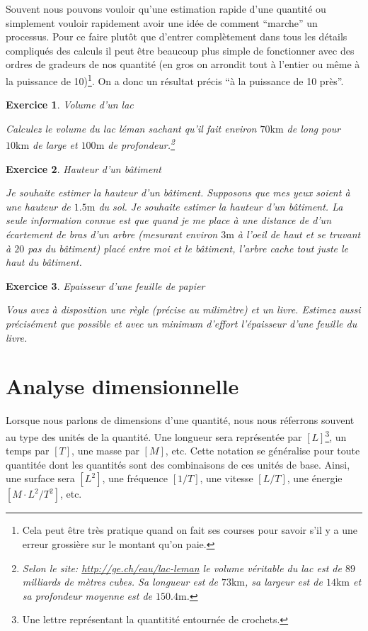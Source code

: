 \documentclass[a4paper,12pt]{book}
\newtheorem{exercice}{Exercice}
\newcommand{\km}{\mathrm{km}}
\newcommand{\m}{\mathrm{m}}
\begin{document}
Souvent nous pouvons vouloir qu'une estimation rapide d'une quantité ou simplement vouloir rapidement avoir une idée 
de comment ``marche'' un processus. Pour ce faire plutôt que d'entrer complètement dans tous les détails compliqués des calculs
il peut être beaucoup plus simple de fonctionner avec des ordres de gradeurs de nos quantité (en gros on arrondit tout à l'entier ou même 
à la puissance de 10)\footnote{Cela peut être très pratique quand on fait ses courses pour savoir s'il y a une erreur grossière sur le montant qu'on paie.}.
On a donc un résultat précis ``à la puissance de 10 près''. 
\begin{exercice}{Volume d'un lac}

 Calculez le volume du lac léman sachant qu'il fait environ $70\km$ de long pour $10\km$ de large et $100\m$ de profondeur.\footnote{Selon le site: \url{http://ge.ch/eau/lac-leman} le volume véritable du lac est de $89$ milliards de mètres cubes. Sa longueur est de $73\km$, sa largeur est de $14\km$ et sa profondeur moyenne est de $150.4\m$.}
\end{exercice}
\begin{exercice}{Hauteur d'un bâtiment}

Je souhaite estimer la hauteur d'un bâtiment. Supposons que mes yeux soient à une hauteur de $1.5\m$ du sol. Je souhaite estimer la hauteur d'un bâtiment. La seule information connue est que quand je me place 
à une distance de d'un écartement de bras d'un arbre (mesurant environ $3\m$ à l'oeil de haut et se truvant à $20$ pas du bâtiment) placé entre moi et le bâtiment, 
l'arbre cache tout juste le haut du bâtiment.
\end{exercice}

\begin{exercice}{Epaisseur d'une feuille de papier}

Vous avez à disposition une règle (précise au milimètre) et un livre. 
Estimez aussi précisément que possible et avec un minimum d'effort
l'épaisseur d'une feuille du livre.
\end{exercice}

\section{Analyse dimensionnelle}

Lorsque nous parlons de dimensions d'une quantité, nous nous réferrons souvent au type des unités de la quantité. Une longueur 
sera représentée par $[L]$\footnote{Une lettre représentant la quantitité entournée de crochets.}, un temps par $[T]$, une masse par $[M]$, etc.
Cette notation se généralise pour toute quantitée dont les quantités sont des combinaisons de ces unités de base. Ainsi, une surface sera $[L^2]$,
une fréquence $[1/T]$, une vitesse $[L/T]$, une énergie $[M\cdot L^2/T^2]$, etc.
\end{document}

